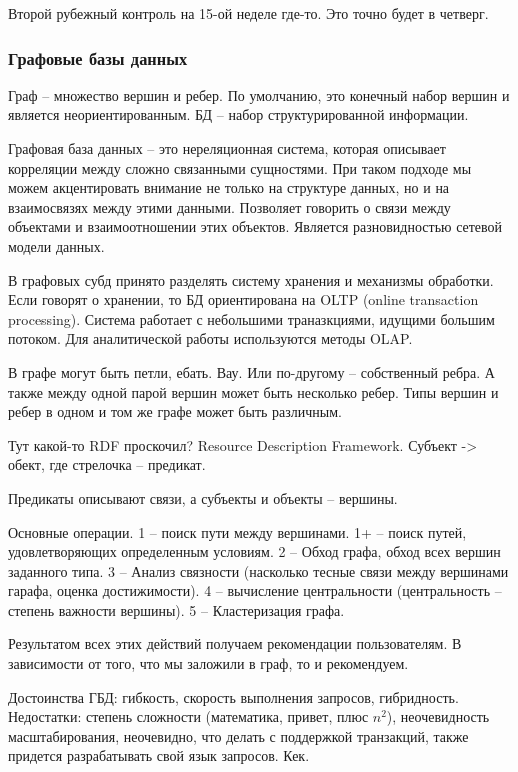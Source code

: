 Второй рубежный контроль на 15-ой неделе где-то. Это точно будет в четверг.

\subsubsection{Графовые базы данных}

Граф -- множество вершин и ребер. По умолчанию, это конечный набор вершин и является неориентированным. БД -- набор структурированной информации.

Графовая база данных -- это нереляционная система, которая описывает корреляции между сложно связанными сущностями. При таком подходе мы можем акцентировать внимание не только на структуре данных, но и на взаимосвязях между этими данными. Позволяет говорить о связи между объектами и взаимоотношении этих объектов. Является разновидностью сетевой модели данных. 

В графовых субд принято разделять систему хранения и механизмы обработки. Если говорят о хранении, то БД ориентирована на OLTP (online transaction processing). Система работает с небольшими траназкциями, идущими большим потоком. Для аналитической работы используются методы OLAP.

В графе могут быть петли, ебать. Вау. Или по-другому -- собственный ребра. А также между одной парой вершин может быть несколько ребер. Типы вершин и ребер в одном и том же графе может быть различным. 

Тут какой-то RDF проскочил? Resource Description Framework. Субъект -> обект, где стрелочка -- предикат.

Предикаты описывают связи, а субъекты и объекты -- вершины.

Основные операции. 1 -- поиск пути между вершинами. 1+ -- поиск путей, удовлетворяющих определенным условиям. 2 -- Обход графа, обход всех вершин заданного типа. 3 -- Анализ связности (насколько тесные связи между вершинами гарафа, оценка достижимости). 4 -- вычисление центральности (центральность -- степень важности вершины). 5 -- Кластеризация графа.

Результатом всех этих действий получаем рекомендации пользователям. В зависимости от того, что мы заложили в граф, то и рекомендуем. 

Достоинства ГБД: гибкость, скорость выполнения запросов, гибридность. Недостатки: степень сложности (математика, привет, плюс $n^2$), неочевидность масштабирования, неочевидно, что делать с поддержкой транзакций, также придется разрабатывать свой язык запросов. Кек. 

